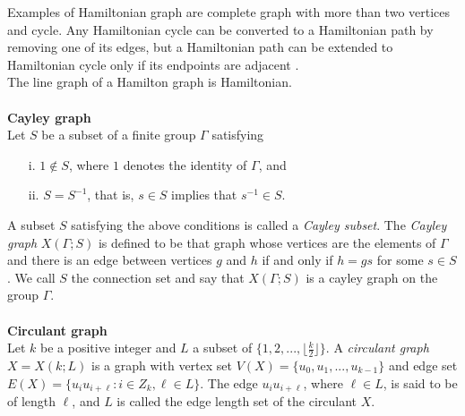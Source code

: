 \documentclass[12pt]{report}
\begin{document}
Examples of Hamiltonian graph are complete graph with more than two vertices and cycle.
Any Hamiltonian cycle  can be converted  to a Hamiltonian path  by removing one of its edges, but a Hamiltonian path can be extended to Hamiltonian cycle only if its endpoints are adjacent .\\
The line graph of a Hamilton graph is Hamiltonian.\\
\\
{\bf Cayley graph}\\
 Let $S$ be a subset of a finite group $\Gamma$ satisfying
 \begin{enumerate}
\item[i.] $1\notin S$, where $1$ denotes the identity of $\Gamma$, and
\item[ii.] $S=S^{-1}$, that is, $s\in S$ implies that $s^{-1}\in S$.
\end{enumerate}
A subset $S$ satisfying the above conditions is called a {\em Cayley subset}. The {\em Cayley graph} $X(\Gamma;S)$ is defined to be that graph whose vertices are the elements of $\Gamma$ and there is an edge between vertices $g$ and $h$ if and only if $h=gs$ for some $s\in S$. We call $S$ the connection set and say that $X(\Gamma;S)$ is a cayley graph on the group $\Gamma$.\\
\\
{\bf  Circulant graph}\\  Let $k$ be a positive integer and $L$ a subset of $\{ 1,2,...,\lfloor \frac{k}{2}\rfloor \}$. A {\em circulant graph} $X=X(k;L)$ is a graph with vertex set $V(X)=\{u_0,u_1,...,u_{k-1}\}$ and edge set $E(X)=\{ u_iu_{i+\ell}:i\in Z_k,\ell  \in L\}$. The edge $u_iu_{i+\ell}$, where $\ell\in L$, is said to be of length $\ell$, and $L$ is called the edge length set of the circulant $X$.\\
\end{document}
